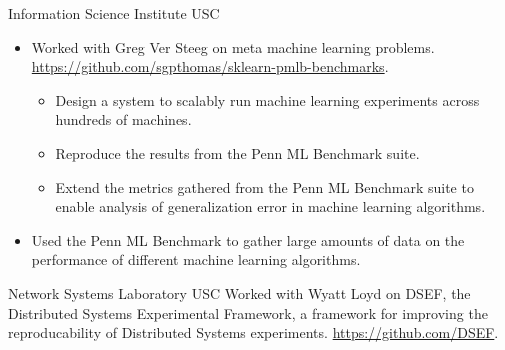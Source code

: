 \documentclass[10pt,a4paper,sans]{moderncv}        %
\begin{document}
%
{Information Science Institute}
{USC}
{}
{}
{
  \begin{itemize}
  \item Worked with Greg Ver Steeg on meta machine learning problems.
    \url{https://github.com/sgpthomas/sklearn-pmlb-benchmarks}.
    \begin{itemize}
    \item Design a system to scalably run machine learning experiments across
      hundreds of machines.
    \item Reproduce the results from the Penn ML Benchmark suite.
    \item Extend the metrics gathered from the Penn ML Benchmark suite to enable
      analysis of generalization error in machine learning algorithms.
    \end{itemize}
  \item Used the Penn ML Benchmark to gather large amounts of data on the
    performance of different machine learning algorithms.
  \end{itemize}
}
%
{Network Systems Laboratory}
{USC}
{}
{}
{Worked with Wyatt Loyd on DSEF, the Distributed Systems Experimental Framework, a framework for
  improving the reproducability of Distributed Systems experiments.\newline
  \url{https://github.com/DSEF}.}

\end{document}
